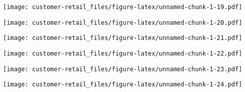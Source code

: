 \documentclass[
]{article}
\newenvironment{Shaded}{\begin{snugshade}}{\end{snugshade}}
\newcommand{\AttributeTok}[1]{\textcolor[rgb]{0.77,0.63,0.00}{#1}}
\newcommand{\CommentTok}[1]{\textcolor[rgb]{0.56,0.35,0.01}{\textit{#1}}}
\newcommand{\FunctionTok}[1]{\textcolor[rgb]{0.00,0.00,0.00}{#1}}
\newcommand{\NormalTok}[1]{#1}
\newcommand{\SpecialCharTok}[1]{\textcolor[rgb]{0.00,0.00,0.00}{#1}}
\begin{document}
\texttt{[image: customer-retail\_files/figure-latex/unnamed-chunk-1-19.pdf]}

\begin{Shaded}
\end{Shaded}

\texttt{[image: customer-retail\_files/figure-latex/unnamed-chunk-1-20.pdf]}

\begin{Shaded}
\end{Shaded}

\texttt{[image: customer-retail\_files/figure-latex/unnamed-chunk-1-21.pdf]}

\begin{Shaded}
\end{Shaded}

\texttt{[image: customer-retail\_files/figure-latex/unnamed-chunk-1-22.pdf]}

\begin{Shaded}
\end{Shaded}

\texttt{[image: customer-retail\_files/figure-latex/unnamed-chunk-1-23.pdf]}

\begin{Shaded}
\end{Shaded}

\texttt{[image: customer-retail\_files/figure-latex/unnamed-chunk-1-24.pdf]}
\end{document}

